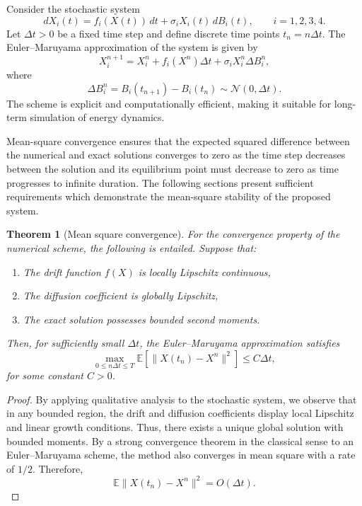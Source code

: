 \documentclass[11pt]{article}
\numberwithin{equation}{section}
\newtheorem{theorem}{Theorem}[section]
\begin{document}
Consider the stochastic system
\begin{equation}
dX_i(t) = f_i(X(t))\,dt + \sigma_i X_i(t)\, dB_i(t),
\qquad i=1,2,3,4.
\end{equation}
Let $\Delta t > 0$ be a fixed time step and define discrete time points 
$t_n = n\Delta t$. The Euler--Maruyama approximation of the system is given by
\begin{equation}
X_i^{n+1} = X_i^n + f_i(X^n)\Delta t + \sigma_i X_i^n \Delta B_i^n,
\tag{4.1}
\end{equation}
where
\begin{equation}
\Delta B_i^n = B_i(t_{n+1}) - B_i(t_n) \sim \mathcal{N}(0,\Delta t).
\end{equation}
The scheme is explicit and computationally efficient, making it suitable for long-term simulation of energy dynamics.

Mean-square convergence ensures that the expected squared difference between the numerical and exact solutions converges to zero as the time step decreases between the solution and its equilibrium point must decrease to zero as time progresses to infinite duration. The following sections present sufficient requirements which demonstrate the mean-square stability of the proposed system.
\\

\begin{theorem}[Mean square convergence]\label{thm:msq-cngce}
For the convergence property of the numerical scheme, the following is entailed. Suppose that:
\begin{enumerate}
\item [i]The drift function $f(X)$ is locally Lipschitz continuous,
\item [ii]The diffusion coefficient is globally Lipschitz,
\item [iii] The exact solution possesses bounded second moments.
\end{enumerate}
Then, for sufficiently small $\Delta t$, the Euler--Maruyama approximation satisfies
\begin{equation}
\max_{0 \le n\Delta t \le T}
\mathbb{E}\left[ \lVert X(t_n) - X^n \rVert^2 \right]
\le C \Delta t,
\end{equation}
for some constant $C>0$.
\end{theorem}

\begin{proof}
By applying qualitative analysis to the stochastic system, we observe that in any bounded region, the drift and diffusion coefficients display local Lipschitz and linear growth conditions. Thus, there exists a unique global solution with bounded moments.
By a strong convergence theorem in the classical sense to an Euler--Maruyama scheme, the method also converges in mean square with a rate of $1/2$. Therefore,
\[
\mathbb{E}\lVert X(t_n) - X^n \rVert^2 = O(\Delta t).
\]
\end{proof}
\end{document}

